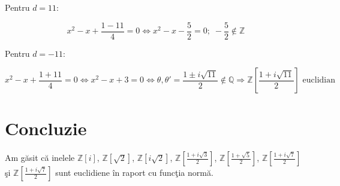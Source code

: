 \documentclass[12pt]{article}
\begin{document}
Pentru $d = 11$:

\begin{equation*}
    x^2 - x + \frac{1 - 11}{4} = 0
    \Leftrightarrow x^2 - x - \frac{5}{2} = 0; \; -\frac{5}{2} \notin \mathbb{Z}
\end{equation*}

Pentru $d = -11$:

\begin{equation}
    x^2 - x + \frac{1 + 11}{4} = 0
    \Leftrightarrow x^2 - x + 3 = 0
    \Leftrightarrow \theta, \theta' = \frac{1 \pm i\sqrt{11}}{2} \notin \mathbb{Q}
    \Rightarrow \boxed{\mathbb{Z}\left[\frac{1 + i\sqrt{11}}{2}\right] \text{ euclidian}}
\end{equation}

\section*{Concluzie}
Am găsit că inelele
$\mathbb{Z}[i]$,
$\mathbb{Z}[\sqrt{2}]$,
$\mathbb{Z}[i\sqrt{2}]$,
$\mathbb{Z}\left[\frac{1 + i\sqrt{3}}{2}\right]$,
$\mathbb{Z}\left[\frac{1 + \sqrt{5}}{2}\right]$,
$\mathbb{Z}\left[\frac{1 + i\sqrt{7}}{2}\right]$ şi
$\mathbb{Z}\left[\frac{1 + i\sqrt{7}}{2}\right]$
sunt euclidiene în raport cu funcţia normă.
\end{document}
